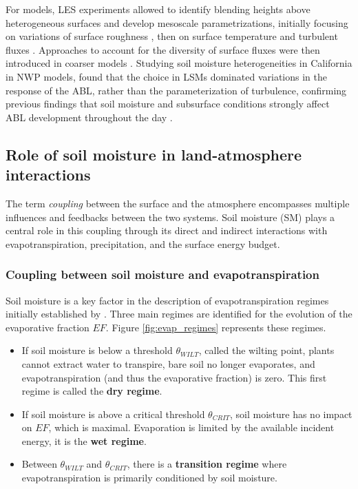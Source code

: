 For models, LES experiments allowed to identify blending heights above heterogeneous surfaces and develop mesoscale parametrizations, initially focusing on variations of surface roughness \citep{bou-zeid_large-eddy_2004}, then on surface temperature and turbulent fluxes \citep{stoll_surface_2009}. Approaches to account for the diversity of surface fluxes were then introduced in coarser models \citep{ament_improved_2006}. Studying soil moisture heterogeneities in California in NWP models, \citet{alexander_simulating_2022} found that the choice in LSMs dominated variations in the response of the ABL, rather than the parameterization of turbulence, confirming previous findings that soil moisture and subsurface conditions strongly affect ABL development throughout the day \citep{rihani_isolating_2015}.

\subsection{Role of soil moisture in land-atmosphere interactions}

The term \textit{coupling} between the surface and the atmosphere encompasses multiple influences and feedbacks between the two systems. Soil moisture (SM) plays a central role in this coupling through its direct and indirect interactions with evapotranspiration, precipitation, and the surface energy budget.

\subsubsection*{Coupling between soil moisture and evapotranspiration}

Soil moisture is a key factor in the description of evapotranspiration regimes initially established by \citet{Budyko_1956, Budyko_1974}. Three main regimes are identified for the evolution of the evaporative fraction $EF$. Figure \ref{fig:evap_regimes} represents these regimes.

\begin{itemize}
    \item If soil moisture is below a threshold $\theta_{WILT}$, called the wilting point, plants cannot extract water to transpire, bare soil no longer evaporates, and evapotranspiration (and thus the evaporative fraction) is zero. This first regime is called the \textbf{dry regime}.
    \item If soil moisture is above a critical threshold $\theta_{CRIT}$, soil moisture has no impact on $EF$, which is maximal. Evaporation is limited by the available incident energy, it is the \textbf{wet regime}.
    \item Between $\theta_{WILT}$ and $\theta_{CRIT}$, there is a \textbf{transition regime} where evapotranspiration is primarily conditioned by soil moisture. 
\end{itemize}

